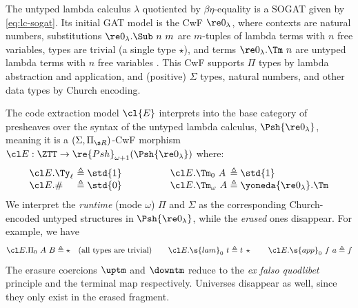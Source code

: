 \begin{definition}\label{def:code-extr}
The untyped lambda calculus $\lambda$ quotiented by $\beta\eta$-equality is a SOGAT given by
\cref{eq:lc-sogat}. Its initial GAT model is the CwF $\re 0_\lambda$, where contexts
are natural numbers, substitutions $\re 0_\lambda.\Sub\ n\ m$ are $m$-tuples of lambda
terms with $n$ free variables, types are trivial (a single type $\star$), and terms
$\re 0_\lambda.\Tm\ n$ are untyped lambda terms with $n$ free variables \cite{Castellan2019-sh}.
This CwF supports $\Pi$ types by lambda abstraction and
application, and (positive) $\Sigma$ types, natural numbers, and other data types by
Church encoding.
\end{definition}

\begin{definition}
  The code extraction model $\cl{E}$ interprets \ZTT into the
  base category of presheaves over the syntax of the untyped lambda calculus,
  $\Psh{\re 0_\lambda}$, meaning it is a $(\Sigma,\Pi_{\s R})$-CwF morphism
  $\cl E : \ZTT \to \re{Psh}_{\omega + 1}(\Psh{\re 0_\lambda})$ where:
  \[
    \begin{array}{c@{\qquad\qquad}c}
      \begin{array}{l@{\ }l}
        \cl E.\Ty_\ell &\triangleq \std{1} \\
        \cl E.\# &\triangleq \std{0}
      \end{array}
      &
      \begin{array}{l@{\ }l}
        \cl E.\Tm_0\ A &\triangleq \std{1} \\
        \cl E.\Tm_\omega\ A &\triangleq \yoneda {\re 0_\lambda}.\Tm
      \end{array}
    \end{array}
  \]
We interpret the \emph{runtime} (mode $\omega$) $\Pi$ and $\Sigma$
as the corresponding Church-encoded untyped structures in $\Psh {\re 0_\lambda}$, while the \emph{erased}
ones disappear. For example, we have
\[
\cl E.\Pi_0\ A\ B \triangleq \star \quad \text{(all types are trivial)} \qquad
\cl E.\s{lam}_0\ t \triangleq t \, \star \qquad \cl E.\s{app}_0\ f\ a \triangleq f
\]
The erasure coercions $\uptm$ and $\downtm$ reduce to the \emph{ex falso quodlibet} principle and
the terminal map respectively.
Universes disappear as well, since they only exist in the erased fragment.
\end{definition}

